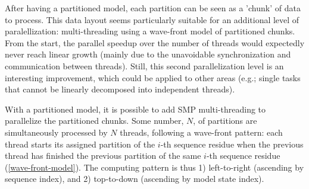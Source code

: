 After having a partitioned model, each partition can be seen as a 'chunk' of data to process. This data layout seems particularly suitable for an additional level of paralellization: multi-threading using a wave-front model of partitioned chunks. From the start, the parallel speedup over the number of threads would expectedly never reach linear growth (mainly due to the unavoidable synchronization and communication between threads). Still, this second parallelization level is an interesting improvement, which could be applied to other areas (e.g.; single tasks that cannot be linearly decomposed into independent threads).


With a partitioned model, it is possible to add \ac{SMP} multi-threading to parallelize the partitioned chunks. Some number, $N$, of partitions are simultaneously processed by $N$ threads, following a wave-front pattern: each thread starts its assigned partition of the $i$-th sequence residue when the previous thread has finished the previous partition of the same $i$-th sequence residue (\autoref{wave-front-model}). The computing pattern is thus 1) left-to-right (ascending by sequence index), and 2) top-to-down (ascending by model state index).

